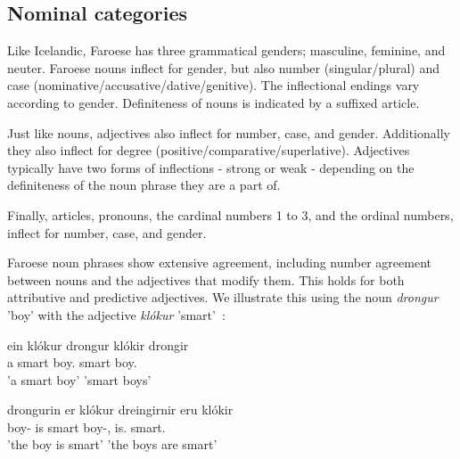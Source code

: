 \documentclass[12pt,%
]{lin-v2/lin}
\begin{document}
\subsection{Nominal categories}

Like Icelandic, Faroese has three grammatical genders; masculine, feminine, and neuter.
Faroese nouns inflect for gender, but also number (singular/plural) and case (nominative/accusative/dative/genitive).
The inflectional endings vary according to gender. Definiteness of nouns is indicated by a suffixed article.

Just like nouns, adjectives also inflect for number, case, and gender. Additionally they also inflect for degree
(positive/comparative/superlative). Adjectives typically have two forms of inflections - strong or weak - depending
on the definiteness of the noun phrase they are a part of.

Finally, articles, pronouns, the cardinal numbers 1 to 3, and the ordinal numbers, inflect for number, case, and gender.

Faroese noun phrases show extensive agreement, including number agreement between nouns and the adjectives that modify them.
This holds for both attributive and predictive adjectives. We illustrate this using the noun \emph{drongur} 'boy'
with the adjective \emph{klókur} 'smart'~\citep[61]{faroese}:
\begin{exe}
    \ex
    \begin{xlist}
    \item \gll ein klókur drongur klókir drongir\\
    a smart boy.\Sg{} smart boy.\Pl{}\\
    \trans 'a smart boy' 'smart boys'
    \item \gll drongurin er klókur dreingirnir eru klókir\\
    boy-\Det{} is smart boy-\Det,\Pl{} is.\Pl{} smart.\Pl\\
    \trans 'the boy is smart' 'the boys are smart'
    \end{xlist}
\end{exe}
\end{document}
